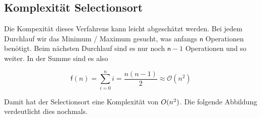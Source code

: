 \documentclass[
  letterpaper,
  DIV=11,
  numbers=noendperiod]{scrreprt}
\begin{document}
\subsection{Komplexität
Selectionsort}\label{komplexituxe4t-selectionsort}

Die Kompexität dieses Verfahrens kann leicht abgeschätzt werden. Bei
jedem Durchlauf wir das Minimum / Maximum gesucht, was anfangs
\(\mathsf n\) Operationen benötigt. Beim nächsten Durchlauf sind es nur
noch \(\mathsf n − 1\) Operationen und so weiter. In der Summe sind es
also

\[ \mathsf f(n) = \sum_{i=0}^n i = \frac{n(n-1)}{2} \approx \mathcal{O}(n^2) \]

Damit hat der Selectionsort eine Komplexität von
\(\mathsf \mathcal{O}(n^2)\). Die folgende Abbildung verdeutlicht dies
nochmals.
\end{document}
